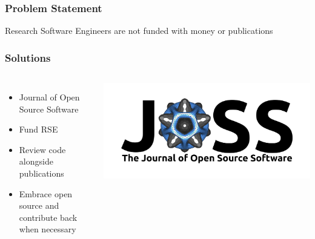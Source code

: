 \documentclass{beamer}
\begin{document}
\begin{frame}
\frametitle{Problem Statement}

\pause

\centering \Huge Research Software Engineers are not funded with money or publications
\end{frame}

\begin{frame}
\frametitle{Solutions}

\begin{columns}

\begin{itemize}
\item Journal of Open Source Software
\item Fund RSE
\item Review code alongside publications
\item Embrace open source and contribute back when necessary
\end{itemize}

\includegraphics[width=\textwidth]{joss.jpg}


\end{columns}
\end{frame}
\end{document}

